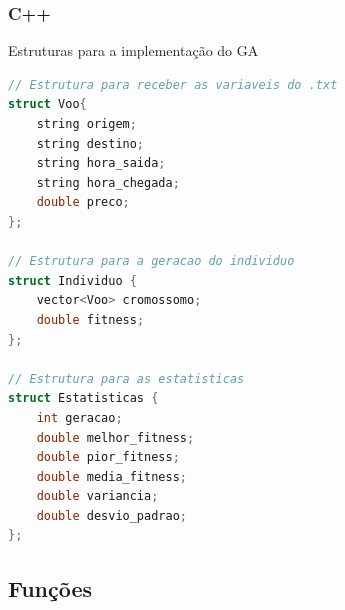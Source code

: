 \documentclass[conference]{IEEEtran}
\begin{document}
\subsubsection{C++}
Estruturas para a implementação do GA

\begin{lstlisting}[caption={Estruturas do GA em C++},language=C++]
// Estrutura para receber as variaveis do .txt
struct Voo{ 
	string origem;
	string destino;
	string hora_saida;
	string hora_chegada;
	double preco;         
}; 

// Estrutura para a geracao do individuo
struct Individuo {
	vector<Voo> cromossomo;     
	double fitness;             
};

// Estrutura para as estatisticas
struct Estatisticas {
	int geracao;
	double melhor_fitness;
	double pior_fitness;
	double media_fitness;
	double variancia;
	double desvio_padrao;
};
\end{lstlisting}



\subsection{Funções}
\end{document}
